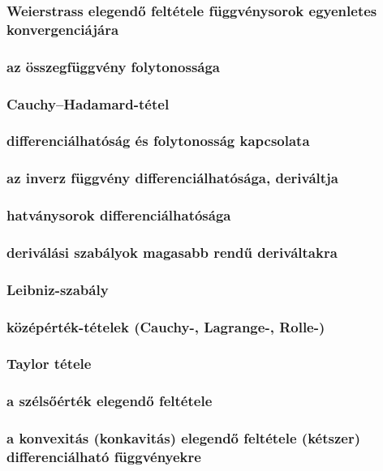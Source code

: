 \documentclass[12pt]{article}
\begin{document}
\subsubsection{Weierstrass elegendő feltétele függvénysorok egyenletes konvergenciájára}
\subsubsection{az összegfüggvény folytonossága}
\subsubsection{Cauchy–Hadamard-tétel}
\subsubsection{differenciálhatóság és folytonosság kapcsolata}
\subsubsection{az inverz függvény differenciálhatósága, deriváltja}
\subsubsection{hatványsorok differenciálhatósága}
\subsubsection{deriválási szabályok magasabb rendű deriváltakra}
\subsubsection{Leibniz-szabály}
\subsubsection{középérték-tételek (Cauchy-, Lagrange-, Rolle-)}
\subsubsection{Taylor tétele}
\subsubsection{a
szélsőérték elegendő feltétele}
\subsubsection{a konvexitás (konkavitás) elegendő feltétele (kétszer)
differenciálható függvényekre}
\end{document}
